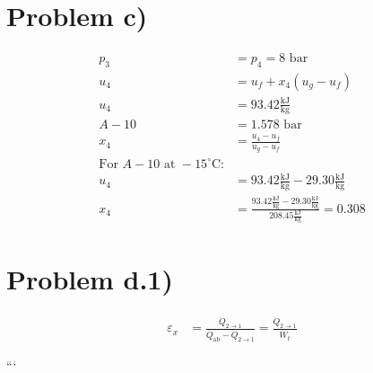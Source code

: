 \section*{Problem c)}

\begin{align*}
    p_3 &= p_4 = 8 \text{ bar} \\
    u_4 &= u_f + x_4 (u_g - u_f) \\
    u_4 &= 93.42 \frac{\text{kJ}}{\text{kg}} \\
    A-10 &= 1.578 \text{ bar} \\
    x_4 &= \frac{u_4 - u_f}{u_g - u_f} \\
    \text{For } A-10 \text{ at } -15^\circ \text{C:} \\
    u_4 &= 93.42 \frac{\text{kJ}}{\text{kg}} - 29.30 \frac{\text{kJ}}{\text{kg}} \\
    x_4 &= \frac{93.42 \frac{\text{kJ}}{\text{kg}} - 29.30 \frac{\text{kJ}}{\text{kg}}}{208.45 \frac{\text{kJ}}{\text{kg}}} = 0.308
\end{align*}

\section*{Problem d.1)}

\begin{align*}
    \varepsilon_x &= \frac{\dot{Q}_{2\to1}}{\dot{Q}_{\text{ab}} - \dot{Q}_{2\to1}} = \frac{\dot{Q}_{2\to1}}{\dot{W}_{t}}
\end{align*}

```